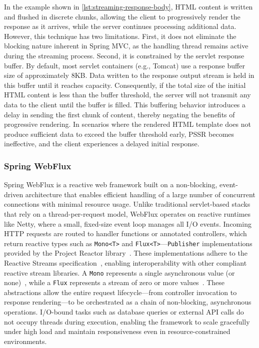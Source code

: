 In the example shown in \autoref{lst:streaming-response-body}, HTML content is
written and flushed in discrete chunks, allowing the client to progressively
render the response as it arrives, while the server continues processing
additional data. However, this technique has two limitations. First, it does
not eliminate the blocking nature inherent in Spring MVC, as the handling
thread remains active during the streaming process. Second, it is constrained
by the servlet response buffer. By default, most servlet containers (e.g.,
Tomcat) use a response buffer size of approximately 8KB. Data written to the
response output stream is held in this buffer until it reaches capacity.
Consequently, if the total size of the initial HTML content is less than the
buffer threshold, the server will not transmit any data to the client until the
buffer is filled. This buffering behavior introduces a delay in sending the
first chunk of content, thereby negating the benefits of progressive rendering.
In scenarios where the rendered HTML template does not produce sufficient data
to exceed the buffer threshold early, PSSR becomes ineffective, and the client
experiences a delayed initial response.

\subsubsection{Spring WebFlux}

Spring WebFlux is a reactive web framework built on a non-blocking,
event-driven architecture that enables efficient handling of a large number of
concurrent connections with minimal resource usage. Unlike traditional
servlet-based stacks that rely on a thread-per-request model, WebFlux operates
on reactive runtimes like Netty, where a small, fixed-size event loop manages
all I/O events. Incoming HTTP requests are routed to handler functions or
annotated controllers, which return reactive types such as \texttt{Mono<T>} and
\texttt{Flux<T>}—\texttt{Publisher} implementations provided by the Project
Reactor library~\cite{projectreactor}. These implementations adhere to the
Reactive Streams specification~\cite{ReactiveStreams}, enabling
interoperability with other compliant reactive stream libraries. A
\texttt{Mono} represents a single asynchronous value (or none)~\cite{promise},
while a \texttt{Flux} represents a stream of zero or more
values~\cite{rx-observable}. These abstractions allow the entire request
lifecycle—from controller invocation to response rendering—to be orchestrated
as a chain of non-blocking, asynchronous operations. I/O-bound tasks such as
database queries or external API calls do not occupy threads during execution,
enabling the framework to scale gracefully under high load and maintain
responsiveness even in resource-constrained environments.

